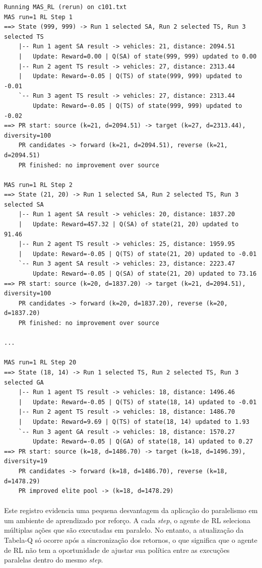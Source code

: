 \vspace{1cm}
\begin{lstlisting}[style=mystats, basicstyle=\scriptsize\ttfamily]
Running MAS_RL (rerun) on c101.txt
MAS run=1 RL Step 1
==> State (999, 999) -> Run 1 selected SA, Run 2 selected TS, Run 3 selected TS
    |-- Run 1 agent SA result -> vehicles: 21, distance: 2094.51
    |   Update: Reward=0.00 | Q(SA) of state(999, 999) updated to 0.00
    |-- Run 2 agent TS result -> vehicles: 27, distance: 2313.44
    |   Update: Reward=-0.05 | Q(TS) of state(999, 999) updated to -0.01
    `-- Run 3 agent TS result -> vehicles: 27, distance: 2313.44
        Update: Reward=-0.05 | Q(TS) of state(999, 999) updated to -0.02
==> PR start: source (k=21, d=2094.51) -> target (k=27, d=2313.44), diversity=100
    PR candidates -> forward (k=21, d=2094.51), reverse (k=21, d=2094.51)
    PR finished: no improvement over source

MAS run=1 RL Step 2
==> State (21, 20) -> Run 1 selected SA, Run 2 selected TS, Run 3 selected SA
    |-- Run 1 agent SA result -> vehicles: 20, distance: 1837.20
    |   Update: Reward=457.32 | Q(SA) of state(21, 20) updated to 91.46
    |-- Run 2 agent TS result -> vehicles: 25, distance: 1959.95
    |   Update: Reward=-0.05 | Q(TS) of state(21, 20) updated to -0.01
    `-- Run 3 agent SA result -> vehicles: 23, distance: 2223.47
        Update: Reward=-0.05 | Q(SA) of state(21, 20) updated to 73.16
==> PR start: source (k=20, d=1837.20) -> target (k=21, d=2094.51), diversity=100
    PR candidates -> forward (k=20, d=1837.20), reverse (k=20, d=1837.20)
    PR finished: no improvement over source

...

MAS run=1 RL Step 20
==> State (18, 14) -> Run 1 selected TS, Run 2 selected TS, Run 3 selected GA
    |-- Run 1 agent TS result -> vehicles: 18, distance: 1496.46
    |   Update: Reward=-0.05 | Q(TS) of state(18, 14) updated to -0.01
    |-- Run 2 agent TS result -> vehicles: 18, distance: 1486.70
    |   Update: Reward=9.69 | Q(TS) of state(18, 14) updated to 1.93
    `-- Run 3 agent GA result -> vehicles: 18, distance: 1570.27
        Update: Reward=-0.05 | Q(GA) of state(18, 14) updated to 0.27
==> PR start: source (k=18, d=1486.70) -> target (k=18, d=1496.39), diversity=19
    PR candidates -> forward (k=18, d=1486.70), reverse (k=18, d=1478.29)
    PR improved elite pool -> (k=18, d=1478.29)
\end{lstlisting}

\paragraph{} Este registro evidencia uma pequena desvantagem da aplicação do paralelismo em um ambiente de aprendizado por reforço. A cada \textit{step}, o agente de RL seleciona múltiplas ações que são executadas em paralelo. No entanto, a atualização da Tabela-Q só ocorre após a sincronização dos retornos, o que significa que o agente de RL não tem a oportunidade de ajustar sua política entre as execuções paralelas dentro do mesmo \textit{step}.
